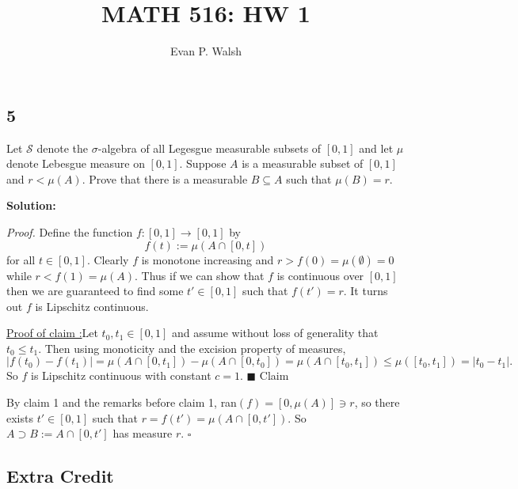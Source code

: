 \documentclass[12pt]{article}
\title{MATH 516: HW 1}
\author{Evan P. Walsh}
\newcounter{ProofCounter}
\newcounter{ClaimCounter}[ProofCounter]
\newenvironment{Proof}{\stepcounter{ProofCounter}\textit{Proof.}}{\hfill$\square$}
\newenvironment{claim}[1]{\vspace{1mm}\stepcounter{ClaimCounter}\par\noindent\underline{\bf Claim \theClaimCounter:}\space#1}{}
\newenvironment{claimproof}[1]{\par\noindent\underline{Proof of claim \theClaimCounter:}\space#1}{\hfill $\blacksquare$ Claim \theClaimCounter}
\begin{document}
\maketitle

\subsection*{5}
Let $\mathcal{S}$ denote the $\sigma$-algebra of all Legesgue measurable subsets of $[0,1]$ and let $\mu$ denote Lebesgue measure on $[0,1]$. Suppose
$A$ is a measurable subset of $[0,1]$ and $r < \mu(A)$. Prove that there is a measurable $B \subseteq A$ such that $\mu(B) = r$.

{\bf Solution:}

\begin{Proof}
Define the function $f : [0,1] \rightarrow [0,1]$ by 
\[ f(t) := \mu(A \cap [0,t]) \]
for all $t \in [0,1]$. Clearly $f$ is monotone increasing and $r > f(0) = \mu(\emptyset) = 0$ while $r < f(1) = \mu(A)$. Thus if we can show that $f$
is continuous over $[0,1]$ then we are guaranteed to find some $t' \in [0,1]$ such that $f(t') = r$. It turns out $f$ is Lipschitz continuous.

\begin{claimproof}
Let $t_{0}, t_{1} \in [0,1]$ and assume without loss of generality that $t_{0} \leq t_{1}$. Then using monoticity and the excision property of
measures,
\[ |f(t_{0}) - f(t_{1})| = \mu(A\cap[0,t_{1}]) - \mu(A\cap[0,t_{0}]) = \mu(A\cap[t_{0},t_{1}]) \leq \mu([t_{0},t_{1}]) = |t_{0} - t_{1}|. \]
So $f$ is Lipschitz continuous with constant $c = 1$.
\end{claimproof}

By claim 1 and the remarks before claim 1, ran$(f) = [0, \mu(A)] \ni r$, so there exists $t' \in [0,1]$ such that $r = f(t') = \mu(A \cap [0,t'])$. So
$A \supset B := A \cap [0,t']$ has measure $r$.
\end{Proof}

\subsection*{Extra Credit}
\end{document}
